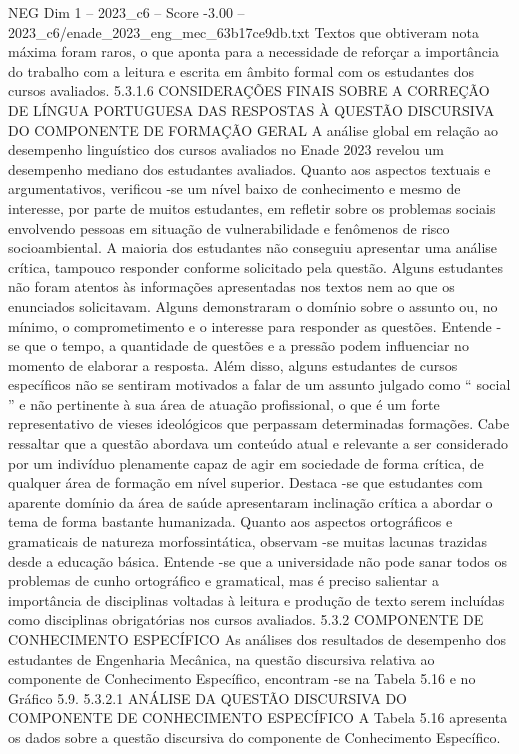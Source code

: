 \begin{textsample}{NEG Dim 1 – 2023\_c6 – Score -3.00 – 2023\_c6/enade\_2023\_eng\_mec\_63b17ce9db.txt}
Textos que obtiveram nota máxima foram raros, o que aponta para a necessidade de reforçar a importância do trabalho com a leitura e escrita em âmbito formal com os estudantes dos cursos avaliados. 5.3.1.6 CONSIDERAÇÕES FINAIS SOBRE A CORREÇÃO DE LÍNGUA PORTUGUESA DAS RESPOSTAS À QUESTÃO DISCURSIVA DO COMPONENTE DE FORMAÇÃO GERAL A análise global em relação ao desempenho linguístico dos cursos avaliados no Enade 2023 revelou um desempenho mediano dos estudantes avaliados.
Quanto aos aspectos textuais e argumentativos, verificou -se um nível baixo de conhecimento e mesmo de interesse, por parte de muitos estudantes, em refletir sobre os problemas sociais envolvendo pessoas em situação de vulnerabilidade e fenômenos de risco socioambiental.
A maioria dos estudantes não conseguiu apresentar uma análise crítica, tampouco responder conforme solicitado pela questão.
Alguns estudantes não foram atentos às informações apresentadas nos textos nem ao que os enunciados solicitavam.
Alguns demonstraram o domínio sobre o assunto ou, no mínimo, o comprometimento e o interesse para responder as questões.
Entende -se que o tempo, a quantidade de questões e a pressão podem influenciar no momento de elaborar a resposta.
Além disso, alguns estudantes de cursos específicos não se sentiram motivados a falar de um assunto julgado como “ social ” e não pertinente à sua área de atuação profissional, o que é um forte representativo de vieses ideológicos que perpassam determinadas formações.
Cabe ressaltar que a questão abordava um conteúdo atual e relevante a ser considerado por um indivíduo plenamente capaz de agir em sociedade de forma crítica, de qualquer área de formação em nível superior.
Destaca -se que estudantes com aparente domínio da área de saúde apresentaram inclinação crítica a abordar o tema de forma bastante humanizada.
Quanto aos aspectos ortográficos e gramaticais de natureza morfossintática, observam -se muitas lacunas trazidas desde a educação básica.
Entende -se que a universidade não pode sanar todos os problemas de cunho ortográfico e gramatical, mas é preciso salientar a importância de disciplinas voltadas à leitura e produção de texto serem incluídas como disciplinas obrigatórias nos cursos avaliados. 5.3.2 COMPONENTE DE CONHECIMENTO ESPECÍFICO As análises dos resultados de desempenho dos estudantes de Engenharia Mecânica, na questão discursiva relativa ao componente de Conhecimento Específico, encontram -se na Tabela 5.16 e no Gráfico 5.9. 5.3.2.1 ANÁLISE DA QUESTÃO DISCURSIVA DO COMPONENTE DE CONHECIMENTO ESPECÍFICO A Tabela 5.16 apresenta os dados sobre a questão discursiva do componente de Conhecimento Específico.

\end{textsample}
